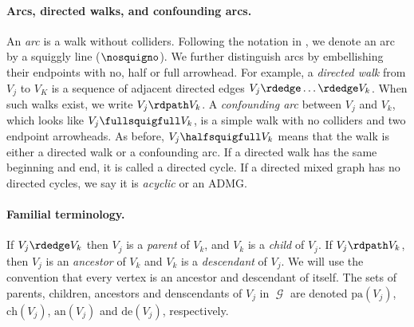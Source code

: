 \documentclass[12pt,a4paper]{article}
\theoremstyle{definition}
\newcommand{\pa}[0]{\text{pa}}
\newcommand{\ch}[0]{\text{ch}}
\newcommand{\an}[0]{\text{an}}
\newcommand{\de}[0]{\text{de}}
\DeclareMathOperator{\gG}{\mathscr{G}}
\begin{document}
\paragraph{Arcs, directed walks, and confounding
    arcs.} An \emph{arc} is a walk without colliders. Following the
  notation in \textcite{zhao_matrix_2024}, we denote an arc by a
squiggly line ($\nosquigno$). %
We further distinguish
arcs by embellishing their endpoints with no, half or full
arrowhead. For example, a \emph{directed walk} from $V_j$ to $V_K$ is
a sequence of adjacent directed edges
$V_j \rdedge \dots \rdedge V_k$. When such walks exist, we write $V_j
\rdpath V_k$. A \emph{confounding arc}
between $V_j$ and $V_k$, which looks like $V_j \fullsquigfull V_k$, is
a simple walk
with no colliders and two endpoint arrowheads. As before, $V_j
\halfsquigfull V_k$ means that the walk is either a directed walk or a
confounding arc. If a directed walk has the same beginning and end, it
is called a directed cycle. If a directed mixed graph has no directed
cycles, we say it is \emph{acyclic} or an ADMG.%
\paragraph{Familial terminology.} If $V_j \rdedge V_k$ then
$V_j$ is a \emph{parent} of $V_k$, and $V_k$ is a \emph{child} of $V_j$. If $V_j
\rdpath V_k$, then $V_j$ is an \emph{ancestor} of $V_k$ and $V_k$ is a
\emph{descendant} of $V_j$. We will use the convention that every vertex is
an ancestor and descendant of itself. The sets of parents, children,
ancestors and denscendants of $V_j$ in $\gG$ are denoted $\pa(V_j)$,
$\ch(V_j)$, $\an(V_j)$ and $\de(V_j)$, respectively. %
\end{document}
